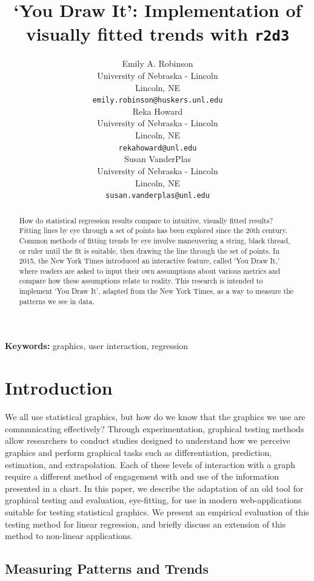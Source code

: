 \documentclass[10pt]{article}
\title{`You Draw It': Implementation of visually fitted trends with
\texttt{r2d3}}
\author{
  Emily A. Robinson \\
  \small{University of Nebraska - Lincoln}\\
  \small{Lincoln, NE} \\
  \small{\tt emily.robinson@huskers.unl.edu} \\\And
 Reka Howard \\
  \small{University of Nebraska - Lincoln}\\
  \small{Lincoln, NE} \\
  \small{\tt rekahoward@unl.edu} \\\And
  Susan VanderPlas \\
  \small{University of Nebraska - Lincoln}\\
  \small{Lincoln, NE} \\
  \small{\tt susan.vanderplas@unl.edu} \\}
\date{}
\begin{document}
\maketitle
\begin{abstract}
How do statistical regression results compare to intuitive, visually
fitted results? Fitting lines by eye through a set of points has been
explored since the 20th century. Common methods of fitting trends by eye
involve maneuvering a string, black thread, or ruler until the fit is
suitable, then drawing the line through the set of points. In 2015, the
New York Times introduced an interactive feature, called `You Draw It,'
where readers are asked to input their own assumptions about various
metrics and compare how these assumptions relate to reality. This
research is intended to implement `You Draw It', adapted from the New
York Times, as a way to measure the patterns we see in data.
\end{abstract}

{\bf Keywords:} graphics, user interaction, regression

\section{Introduction}

We all use statistical graphics, but how do we know that the graphics we
use are communicating {\textcolor{RedOrange}{effectively}}? Through
experimentation, graphical testing methods allow researchers to conduct
studies
{\textcolor{RedOrange}{designed to understand how we perceive graphics and perform graphical tasks}}
such as differentiation, prediction, estimation, and extrapolation.
{\textcolor{RedOrange}{Each of these levels of interaction with a graph require a different method of engagement with and use of the information presented in a chart.}}
{\textcolor{RedOrange}{In this paper, we describe the adaptation of an old tool for graphical testing and evaluation, eye-fitting, for use in modern web-applications suitable for testing statistical graphics. 
We present an empirical evaluation of this testing method for linear regression, and briefly discuss an extension of this method to non-linear applications.}}

\subsection{Measuring Patterns and Trends}
\end{document}
